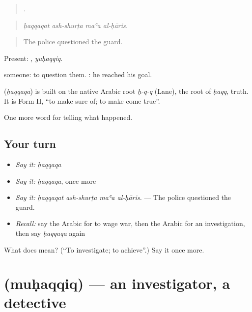 \begin{quote}
   .
\end{quote}

\begin{quote}
\emph{ḥaqqaqat ash-shurṭa maʿa al-ḥāris.}
\end{quote}

\begin{quote}
The police questioned the guard.
\end{quote}

Present: , \emph{yuḥaqqiq}.

  someone: to question them.  : he reached his goal.

\begin{cousinweb}
\textbf{} (\emph{ḥaqqaqa}) is built on the native Arabic root \emph{ḥ-q-q} (Lane), the root of \emph{ḥaqq}, truth. It is Form II, \textquotedblleft{}to make sure of; to make come true\textquotedblright{}.
\end{cousinweb}

\begin{grammarlens}[title={What you've built}]
One more word for telling what happened.
\end{grammarlens}

\subsection*{Your turn}
\begin{itemize}
\raggedright
  \item \emph{Say it:} \emph{ḥaqqaqa}
  \item \emph{Say it:} \emph{ḥaqqaqa}, once more
  \item \emph{Say it:} \emph{ḥaqqaqat ash-shurṭa maʿa al-ḥāris.} — The police questioned the guard.
  \item \emph{Recall:} say the Arabic for to wage war, then the Arabic for an investigation, then say \emph{ḥaqqaqa} again
\end{itemize}

\begin{tcolorbox}[breakable,colback=teal!4,colframe=teal!35!black,title={Before you move on}]
What does  mean? (\textquotedblleft{}To investigate; to achieve\textquotedblright{}.) Say it once more.
\end{tcolorbox}
\section[\texorpdfstring{\ar{محقق} (muḥaqqiq)}{محقق (muḥaqqiq)}]{ (muḥaqqiq) — an investigator, a detective}

